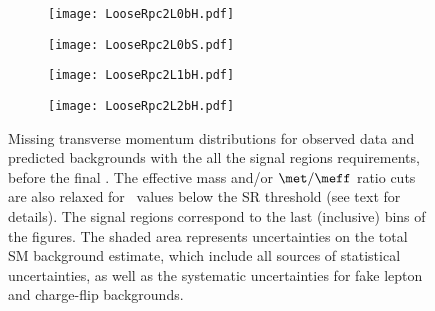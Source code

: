 \begin{figure}[htb!]
\centering
 \begin{subfigure}{0.42\textwidth}
 \texttt{[image: LooseRpc2L0bH.pdf]}
 \end{subfigure}
 \begin{subfigure}{0.42\textwidth}
 \texttt{[image: LooseRpc2L0bS.pdf]}
 \end{subfigure}
  \begin{subfigure}{0.42\textwidth}
 \texttt{[image: LooseRpc2L1bH.pdf]}
 \end{subfigure}
  \begin{subfigure}{0.42\textwidth}
 \texttt{[image: LooseRpc2L2bH.pdf]}
 \end{subfigure}
   \caption{
Missing transverse momentum distributions for observed data and predicted backgrounds 
with the all the signal regions requirements, before the final \met. 
The effective mass and/or $\met/\meff$ ratio cuts are also relaxed for \met\ values below the SR threshold (see text for details). 
The signal regions correspond to the last (inclusive) bins of the figures. 
The shaded area represents uncertainties on the total SM background estimate, 
which include all sources of statistical uncertainties, 
as well as the systematic uncertainties for fake lepton and charge-flip backgrounds. 
}
\label{fig:results_datamc_rpc1}
\end{figure}


